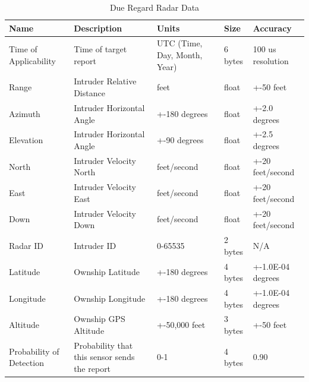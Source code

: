 \documentclass[12pt,oneside,letterpaper]{article}
\begin{document}
\begin{table}[H]
\caption{Due Regard Radar Data}
\centering
\begin{tabular}{|p{}|p{}|p{}|p{}|p{}|}
 \hline
 Name & Description & Units & Size & Accuracy \\
 \hline
 Time of Applicability & Time of target report & UTC (Time, Day, Month, Year) & 6 bytes & 100 us resolution \\
 \hline
 Range & Intruder Relative Distance & feet & float & +-50 feet \\
 \hline
 Azimuth & Intruder Horizontal Angle & +-180 degrees & float & +-2.0 degrees \\
 \hline
 Elevation & Intruder Horizontal Angle & +-90 degrees & float & +-2.5 degrees \\
 \hline
 North & Intruder Velocity North & feet/second & float & +-20 feet/second \\
 \hline
 East & Intruder Velocity East & feet/second & float & +-20 feet/second \\
 \hline
 Down & Intruder Velocity Down & feet/second & float & +-20 feet/second \\
 \hline
 Radar ID & Intruder ID & 0-65535 & 2 bytes & N/A \\
 \hline
 Latitude & Ownship Latitude & +-180 degrees & 4 bytes & +-1.0E-04 degrees \\
 \hline
 Longitude & Ownship Longitude & +-180 degrees & 4 bytes & +-1.0E-04 degrees \\
 \hline
 Altitude & Ownship GPS Altitude & +-50,000 feet & 3 bytes & +-50 feet \\
 \hline
 Probability of Detection & Probability that this sensor sends the report & 0-1 & 4 bytes & 0.90 \\
 \hline
\end{tabular}
\end{table}
\end{document}
